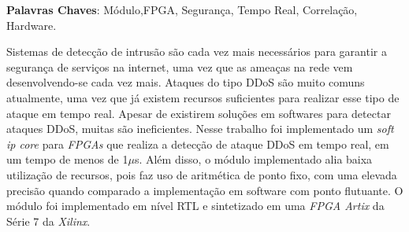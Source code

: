 \setlength{\absparsep}{18pt} %
\begin{resumo}
\noindent 
\textbf{Palavras Chaves}: Módulo,FPGA, Segurança, Tempo Real, Correlação, Hardware.

Sistemas de detecção de intrusão são cada vez mais necessários para garantir a segurança de  serviços na internet, uma vez que as ameaças na rede vem desenvolvendo-se cada vez mais. Ataques do tipo DDoS são muito comuns atualmente, uma vez que já existem recursos suficientes para realizar esse tipo de ataque em tempo real. Apesar de existirem soluções em softwares para detectar ataques DDoS, muitas são ineficientes. Nesse trabalho foi implementado um \textit{soft ip core} para \textit{FPGAs} que realiza a detecção de ataque DDoS em tempo real, em um tempo de menos de 1$\mu$s. Além disso, o módulo implementado  alia baixa utilização de recursos, pois faz uso de aritmética de ponto fixo, com uma elevada precisão quando comparado a implementação em software com ponto flutuante. O módulo foi implementado em nível RTL e sintetizado em uma \textit{FPGA Artix} da Série 7 da \textit{Xilinx}. 

\end{resumo}